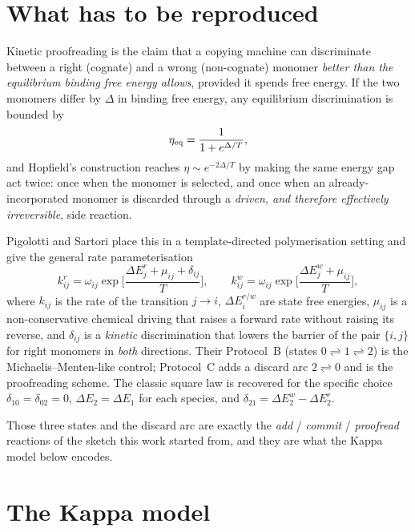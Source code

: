 \section{What has to be reproduced}

Kinetic proofreading is the claim that a copying machine can discriminate between a
right (cognate) and a wrong (non-cognate) monomer \emph{better than the equilibrium
binding free energy allows}, provided it spends free energy.  If the two monomers
differ by $\Delta$ in binding free energy, any equilibrium discrimination is bounded by
\begin{equation}
  \eta_{\rm eq}=\frac{1}{1+e^{\Delta/T}},
  \label{eq:etaeq}
\end{equation}
and Hopfield's construction reaches $\eta\sim e^{-2\Delta/T}$ by making the same
energy gap act twice: once when the monomer is selected, and once when an
already-incorporated monomer is discarded through a \emph{driven, and therefore
effectively irreversible}, side reaction.

Pigolotti and Sartori place this in a template-directed polymerisation setting and
give the general rate parameterisation \cite{ps2016}
\begin{equation}
  k_{ij}^{r}=\omega_{ij}\exp\!\Big[\frac{\Delta E_j^{r}+\mu_{ij}+\delta_{ij}}{T}\Big],
  \qquad
  k_{ij}^{w}=\omega_{ij}\exp\!\Big[\frac{\Delta E_j^{w}+\mu_{ij}}{T}\Big],
  \label{eq:rates}
\end{equation}
where $k_{ij}$ is the rate of the transition $j\!\to\! i$, $\Delta E_i^{r/w}$ are state
free energies, $\mu_{ij}$ is a non-conservative chemical driving that raises a forward
rate without raising its reverse, and $\delta_{ij}$ is a \emph{kinetic} discrimination
that lowers the barrier of the pair $\{i,j\}$ for right monomers in \emph{both}
directions.  Their Protocol~B (states $0\!\rightleftharpoons\!1\!\rightleftharpoons\!2$)
is the Michaelis--Menten-like control; Protocol~C adds a discard arc
$2\!\rightleftharpoons\!0$ and is the proofreading scheme.  The classic square law is
recovered for the specific choice
$\delta_{10}=\delta_{02}=0$, $\Delta E_2=\Delta E_1$ for each species, and
$\delta_{21}=\Delta E_2^{w}-\Delta E_2^{r}$.

Those three states and the discard arc are exactly the \emph{add} / \emph{commit} /
\emph{proofread} reactions of the sketch this work started from, and they are what the
Kappa model below encodes.

\section{The Kappa model}

